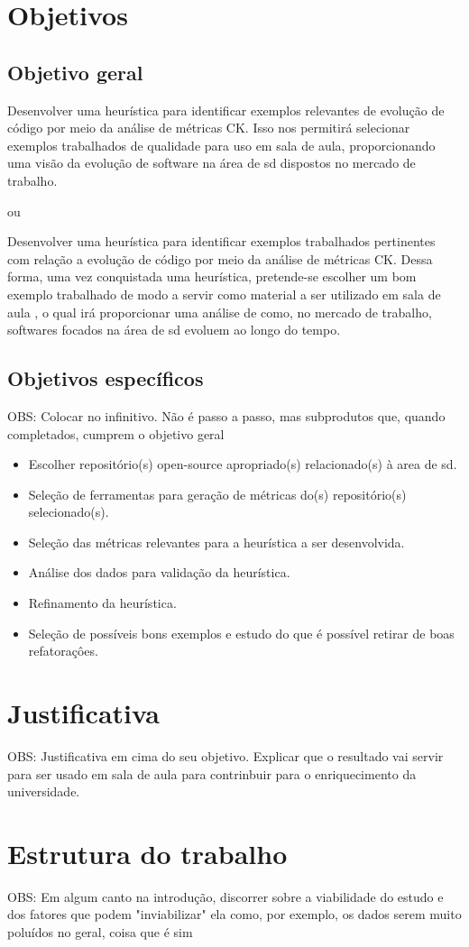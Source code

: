 \section{Objetivos}\label{sec:objetivos}

\subsection{Objetivo geral}\label{subsec:objetivoGeral}

Desenvolver uma heurística para identificar exemplos relevantes de evolução de código por meio da análise de métricas CK. Isso nos permitirá selecionar exemplos trabalhados de qualidade para uso em sala de aula, proporcionando uma visão da evolução de software na área de \gls{sd} dispostos no mercado de trabalho.

ou

Desenvolver uma heurística para identificar exemplos trabalhados pertinentes com relação a evolução de código por meio da análise de métricas CK. Dessa forma, uma vez conquistada uma heurística, pretende-se escolher um bom exemplo trabalhado de modo a servir como material a ser utilizado em sala de aula , o qual irá proporcionar uma análise de como, no mercado de trabalho, softwares focados na área de \gls{sd} evoluem ao longo do tempo.

\subsection{Objetivos específicos}\label{subsec:objetivosEspecificos}
OBS: Colocar no infinitivo. Não é passo a passo, mas subprodutos que, quando completados, cumprem o objetivo geral
\begin{itemize}
    \item Escolher repositório(s) open-source apropriado(s) relacionado(s) à area de \gls{sd}.
    \item Seleção de ferramentas para geração de métricas do(s) repositório(s) selecionado(s).
    \item Seleção das métricas relevantes para a heurística a ser desenvolvida.
    \item Análise dos dados para validação da heurística.
    \item Refinamento da heurística.
    \item Seleção de possíveis bons exemplos e estudo do que é possível retirar de boas refatoraçôes.
\end{itemize}

\section{Justificativa}\label{sec:justificativa}
OBS: Justificativa em cima do seu objetivo.
Explicar que o resultado vai servir para ser usado em sala de aula para contrinbuir para o enriquecimento da universidade.

\section{Estrutura do trabalho}\label{sec:estruturaTrabalho}

OBS: Em algum canto na introdução, discorrer sobre a viabilidade do estudo e dos fatores que podem "inviabilizar" ela como, por exemplo, os dados serem muito poluídos no geral, coisa que é sim